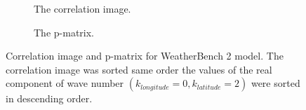 \begin{figure}[H]
  \centering
  \begin{subfigure}{0.49\linewidth}
    \begin{adjustbox}{width=\linewidth}
      
    \end{adjustbox}
    \caption{The correlation image.}\label{fig:sc3_ci}
  \end{subfigure}
  \begin{subfigure}{0.49\linewidth}
    \begin{adjustbox}{width=\linewidth}
      
    \end{adjustbox}
    \caption{The p-matrix.}\label{fig:sc3_pm}
  \end{subfigure}
  \caption{Correlation image and p-matrix for WeatherBench 2 model. The correlation image was sorted same order the values of the real component of wave number \((k_{longitude}=0, k_{latitude}=2)\) were sorted in descending order.}\label{fig:sc3_interpretation}
\end{figure}

